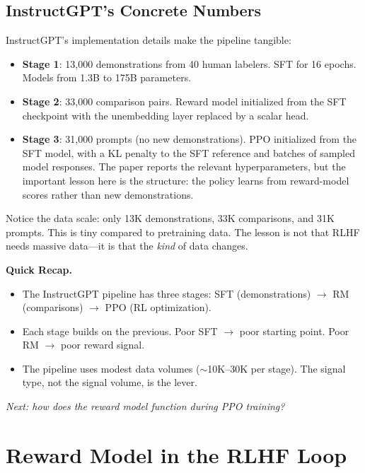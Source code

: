 \subsection{InstructGPT's Concrete Numbers}

InstructGPT's implementation details make the pipeline tangible:

\begin{itemize}[nosep]
  \item \textbf{Stage 1}: 13{,}000 demonstrations from 40 human labelers. SFT for 16 epochs. Models from 1.3B to 175B parameters.
  \item \textbf{Stage 2}: 33{,}000 comparison pairs. Reward model initialized from the SFT checkpoint with the unembedding layer replaced by a scalar head.
  \item \textbf{Stage 3}: 31{,}000 prompts (no new demonstrations). PPO initialized from the SFT model, with a KL penalty to the SFT reference and batches of sampled model responses. The paper reports the relevant hyperparameters, but the important lesson here is the structure: the policy learns from reward-model scores rather than new demonstrations.
\end{itemize}

Notice the data scale: only 13K demonstrations, 33K comparisons, and 31K prompts. This is tiny compared to pretraining data. The lesson is not that RLHF needs massive data---it is that the \emph{kind} of data changes.

\begin{quickrecap}
\textbf{Quick Recap.}
\begin{itemize}[nosep,leftmargin=1.5em]
  \item The InstructGPT pipeline has three stages: SFT (demonstrations) $\to$ RM (comparisons) $\to$ PPO (RL optimization).
  \item Each stage builds on the previous. Poor SFT $\to$ poor starting point. Poor RM $\to$ poor reward signal.
  \item The pipeline uses modest data volumes ($\sim$10K--30K per stage). The signal type, not the signal volume, is the lever.
\end{itemize}
\textit{Next: how does the reward model function during PPO training?}
\end{quickrecap}


\section{Reward Model in the RLHF Loop}
\label{sec:rm-in-loop}

